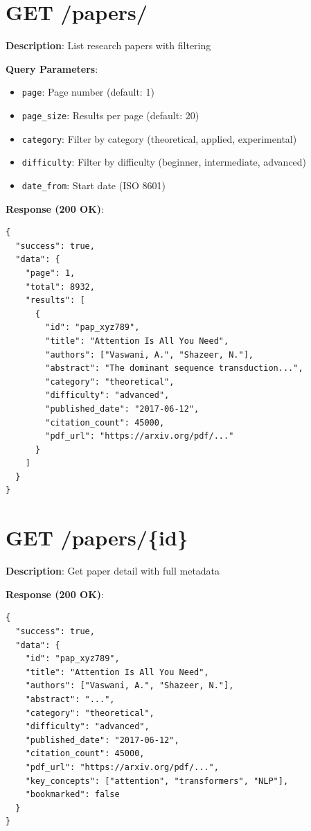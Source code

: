 \documentclass[12pt,a4paper]{report}
\begin{document}
\section{GET /papers/}

\textbf{Description}: List research papers with filtering

\textbf{Query Parameters}:
\begin{itemize}
    \item \texttt{page}: Page number (default: 1)
    \item \texttt{page\_size}: Results per page (default: 20)
    \item \texttt{category}: Filter by category (theoretical, applied, experimental)
    \item \texttt{difficulty}: Filter by difficulty (beginner, intermediate, advanced)
    \item \texttt{date\_from}: Start date (ISO 8601)
\end{itemize}

\textbf{Response (200 OK)}:
\begin{lstlisting}
{
  "success": true,
  "data": {
    "page": 1,
    "total": 8932,
    "results": [
      {
        "id": "pap_xyz789",
        "title": "Attention Is All You Need",
        "authors": ["Vaswani, A.", "Shazeer, N."],
        "abstract": "The dominant sequence transduction...",
        "category": "theoretical",
        "difficulty": "advanced",
        "published_date": "2017-06-12",
        "citation_count": 45000,
        "pdf_url": "https://arxiv.org/pdf/..."
      }
    ]
  }
}
\end{lstlisting}

\section{GET /papers/\{id\}}

\textbf{Description}: Get paper detail with full metadata

\textbf{Response (200 OK)}:
\begin{lstlisting}
{
  "success": true,
  "data": {
    "id": "pap_xyz789",
    "title": "Attention Is All You Need",
    "authors": ["Vaswani, A.", "Shazeer, N."],
    "abstract": "...",
    "category": "theoretical",
    "difficulty": "advanced",
    "published_date": "2017-06-12",
    "citation_count": 45000,
    "pdf_url": "https://arxiv.org/pdf/...",
    "key_concepts": ["attention", "transformers", "NLP"],
    "bookmarked": false
  }
}
\end{lstlisting}
\end{document}
